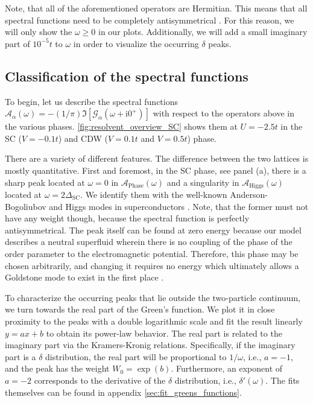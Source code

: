 \documentclass[
    reprint, 
    aps,
    preprintnumbers,
    twocolumn,
    prb,
    superscriptaddress
]{revtex4-2}
\newcommand{\im}{\mathrm{i}}
\newcommand{\spectral}[1]{\mathcal{A}_\text{#1}  (\omega)}
\begin{document}
Note, that all of the aforementioned operators are Hermitian. 
This means that all spectral functions need to be completely antisymmetrical \cite{rickayzen80}.%
For this reason, we will only show the $\omega \geq 0$ in our plots. 
Additionally, we will add a small imaginary part of $10^{-5}t$ to $\omega$ in order to visualize the occurring $\delta$ peaks.


\subsection{Classification of the spectral functions}

To begin, let us describe the spectral functions $\mathcal{A}_\alpha (\omega) = - (1/\pi) \Im [\mathcal{G}_\alpha (\omega + \im 0^+)]$ with respect to the operators above in the various phases.
\autoref{fig:resolvent_overview_SC} shows them at $U = -2.5t$ in the SC ($V=-0.1t$) and CDW ($V=0.1t$ and $V=0.5t$) phase.

There are a variety of different features. The difference between the two lattices is mostly quantitative.
First and foremost, in the SC phase, see panel (a), 
there is a sharp peak located at $\omega=0$ in $\spectral{Phase}$ and a singularity in $\spectral{Higgs}$ located at $\omega=2\Delta_\text{SC}$.
We identify them with the well-known Anderson-Bogoliubov and Higgs modes in superconductors \cite{Bogoljubov1958,Anderson58,Brieskorn74,Schmid1975,simanek1975,schoen1976propagating,Kulik1981,Maiti2015,Sun2020,Fan22,Schmid1975,Varma02,Cea14,Measson14,Tsuji15,Krull16,Mueller2019,Schwarz20}.
Note, that the former must not have any weight though, because the spectral function is perfectly antisymmetrical.
The peak itself can be found at zero energy because our model describes a neutral superfluid 
wherein there is no coupling of the phase of the order parameter to the electromagnetic potential.
Therefore, this phase may be chosen arbitrarily, and changing it requires no energy 
which ultimately allows a Goldstone mode to exist in the first place \cite{Goldstone1961,Anderson63}.

To characterize the occurring peaks that lie outside the two-particle continuum, we turn towards the real part of the Green's function.
We plot it in close proximity to the peaks with a double logarithmic scale and fit the result linearly $y = ax + b$ to obtain its power-law behavior.
The real part is related to the imaginary part via the Kramers-Kronig relations.
Specifically, if the imaginary part is a $\delta$ distribution, the real part will be proportional to $1/\omega$, i.e., $a=-1$, and the peak has the weight $W_0 = \exp(b)$.
Furthermore, an exponent of $a=-2$ corresponds to the derivative of the $\delta$ distribution, i.e., $\delta'(\omega)$.
The fits themselves can be found in appendix \ref{sec:fit_greens_functions}.
\end{document}
